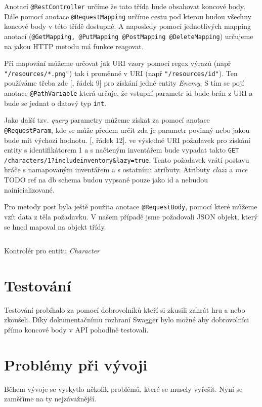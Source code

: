 Anotací \texttt{@RestController} určíme že tato třída bude obsahovat koncové body. Dále pomocí anotace \texttt{@RequestMapping} určíme cestu pod kterou budou všechny koncové body v této třídě dostupné. A naposledy pomocí jednotlivých mapping anotací (\texttt{@GetMapping, @PutMapping @PostMapping @DeleteMapping}) určujeme na jakou HTTP metodu má funkce reagovat. 

Při mapování můžeme určovat jak URI vzory pomocí regex výrazů (např \texttt{"/resources/*.png"}) tak i proměnné v URI (např \texttt{"/resources/{id}"}). Ten používáme třeba zde [, řádek 9] pro získání jedné entity \textit{Enemy}. S tím se pojí anotace \texttt{@PathVariable} která určuje, že vstupní parametr id bude brán z URI a bude se jednat o datový typ \texttt{int}. 

Jako další tzv. \textit{query} parametry můžeme získat za pomocí anotace \texttt{@RequestParam}, kde se může předem určit zda je parametr povinný nebo jakou bude mít výchozí hodnotu. [, řádek 12]. ve výsledné URI požadavek pro získání entity s identifikátorem 1 a s načteným inventářem bude vypadat takto \texttt{GET /characters/1?include\=inventory\&lazy=true}. Tento požadavek vrátí postavu hráče s namapovaným inventářem a s ostatními atributy. Atributy \textit{clazz} a \textit{race} TODO ref na db schema
 budou vypsané pouze jako id a nebudou nainicializované. 

Pro metody post byla ještě použita anotace \texttt{@RequestBody}, pomocí které můžeme vzít data z těla požadavku. V našem případě jsme požadovali JSON objekt, který se hned mapoval na objekt třídy.

\begin{listing}[ht!]
    \inputminted[]{Java}{resources/code/impl/CharacterController.java}
    \caption{Kontrolér pro entitu \textit{Character}}
    \label{code:characterController}
\end{listing}


\section{Testování}\label{sec:testing}
Testování probíhalo za pomocí dobrovolníků kteří si zkusili zahrát hru a nebo zkoušeli. Díky dokumentačnímu rozhraní Swagger 
bylo možné aby dobrovolníci přímo koncové body v API pohodlně testovali.



\section{Problémy při vývoji}
Během vývoje se vyskytlo několik problémů, které se musely vyřešit. Nyní se zaměříme na ty nejzávažnější.
